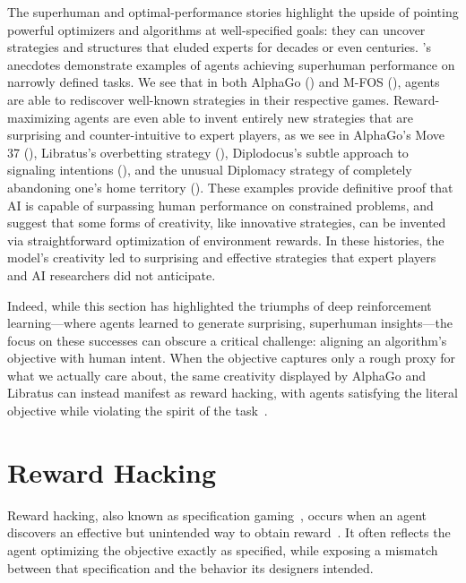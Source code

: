 \documentclass[10pt]{article}
\def\citep#1{}%
\begin{document}
The superhuman and optimal-performance stories highlight the upside of pointing powerful optimizers and algorithms at well-specified goals: they can uncover strategies and structures that eluded experts for decades or even centuries.
's anecdotes demonstrate examples of agents achieving superhuman performance on narrowly defined tasks. We see that in both AlphaGo () and M-FOS (), agents are able to rediscover well-known strategies in their respective games. Reward-maximizing agents are even able to invent entirely new strategies that are surprising and counter-intuitive to expert players, as we see in AlphaGo's Move 37 (), Libratus's overbetting strategy (), Diplodocus's subtle approach to signaling intentions (), and the unusual Diplomacy strategy of completely abandoning one's home territory ().
These examples provide definitive proof that AI is capable of surpassing human performance on constrained problems, and suggest that some forms of creativity, like innovative strategies, can be invented via straightforward optimization of environment rewards.
In these histories, the model's creativity led to surprising and effective strategies that expert players and AI researchers did not anticipate.

Indeed, while this section has highlighted the triumphs of deep reinforcement learning---where agents learned to generate surprising, superhuman insights---the focus on these successes can obscure a critical challenge: aligning an algorithm's objective with human intent.
When the objective captures only a rough proxy for what we actually care about, the same creativity displayed by AlphaGo and Libratus can instead manifest as reward hacking, with agents satisfying the literal objective while violating the spirit of the task~\citep{skalsa2022rewardhacking, specgamingkrakovna2020}.

\section{Reward Hacking}

Reward hacking, also known as specification gaming~\citep{specgamingkrakovna2020}, occurs when an agent discovers an effective but unintended way to obtain reward~\citep{skalsa2022rewardhacking, amodei2016concrete}.
It often reflects the agent optimizing the objective exactly as specified, while exposing a mismatch between that specification and the behavior its designers intended.
\end{document}

